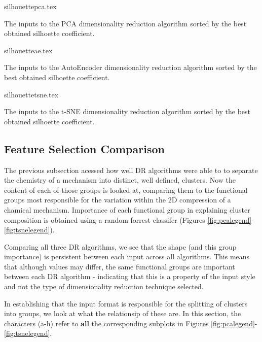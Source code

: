 \begin{table}[H]
    \centering
        {silhouettepca.tex}
        \caption{The inputs to the PCA dimensionality reduction algorithm sorted by the best obtained silhoette coefficient.  }
        \label{tab:pcasil}
\end{table}


\begin{table}[H]
    \centering
        {silhouetteae.tex}
        \caption{The inputs to the AutoEncoder dimensionality reduction algorithm sorted by the best obtained silhoette coefficient.  }
        \label{tab:aesil}
\end{table}

\begin{table}[H]
    \centering
        {silhouettetsne.tex}
        \caption{The inputs to the t-SNE dimensionality reduction algorithm sorted by the best obtained silhoette coefficient.  }
        \label{tab:tsnesil}
\end{table}









\subsection{Feature Selection Comparison}\label{sec:fsclust}

The previous subsection acessed how well DR algorithms were able to to  separate the chemistry of a mechanism into distinct, well defined, clusters. Now the content of each of those groups is looked at, comparing them to the  functional groups most responsible for the variation within the 2D compression of a chamical mechanism. Importance of each functional group in explaining cluster composition is obtained using a random forrest classifer (Figures \ref{fig:pcalegend}-\ref{fig:tsnelegend}).

Comparing all three DR algorithms, we see that the shape (and this group importance) is persistent between each input across all algorithms. This means that although values may differ, the same functional groups are important between each DR algorithm - indicating that this is a property of the input style and not the type of dimensionality reduction technique selected.

In establishing that the input format is responsible for the splitting of clusters into groups, we look at what the relationsip of these are. In this section, the characters (a-h) refer to \textbf{all} the corresponding subplots in Figures \ref{fig:pcalegend}-\ref{fig:tsnelegend}.

